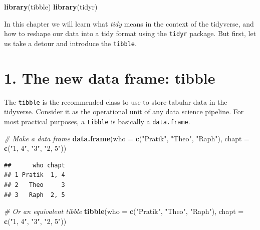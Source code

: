 \documentclass[]{book}
\newenvironment{Shaded}{}{}
\newcommand{\CommentTok}[1]{\textcolor[rgb]{0.38,0.63,0.69}{\textit{#1}}}
\newcommand{\DataTypeTok}[1]{\textcolor[rgb]{0.56,0.13,0.00}{#1}}
\newcommand{\KeywordTok}[1]{\textcolor[rgb]{0.00,0.44,0.13}{\textbf{#1}}}
\newcommand{\NormalTok}[1]{#1}
\newcommand{\StringTok}[1]{\textcolor[rgb]{0.25,0.44,0.63}{#1}}
\begin{document}
\begin{Shaded}
\begin{Highlighting}[]
\KeywordTok{library}\NormalTok{(tibble)}
\KeywordTok{library}\NormalTok{(tidyr)}
\end{Highlighting}
\end{Shaded}

In this chapter we will learn what \emph{tidy} means in the context of the tidyverse, and how to reshape our data into a tidy format using the \texttt{tidyr} package. But first, let us take a detour and introduce the \texttt{tibble}.

\hypertarget{the-new-data-frame-tibble}{%
\section{1. The new data frame: tibble}\label{the-new-data-frame-tibble}}

The \texttt{tibble} is the recommended class to use to store tabular data in the tidyverse. Consider it as the operational unit of any data science pipeline. For most practical purposes, a \texttt{tibble} is basically a \texttt{data.frame}.

\begin{Shaded}
\begin{Highlighting}[]
\CommentTok{# Make a data frame}
\KeywordTok{data.frame}\NormalTok{(}\DataTypeTok{who =} \KeywordTok{c}\NormalTok{(}\StringTok{"Pratik"}\NormalTok{, }\StringTok{"Theo"}\NormalTok{, }\StringTok{"Raph"}\NormalTok{), }\DataTypeTok{chapt =} \KeywordTok{c}\NormalTok{(}\StringTok{"1, 4"}\NormalTok{, }\StringTok{"3"}\NormalTok{, }\StringTok{"2, 5"}\NormalTok{))}
\end{Highlighting}
\end{Shaded}

\begin{verbatim}
##      who chapt
## 1 Pratik  1, 4
## 2   Theo     3
## 3   Raph  2, 5
\end{verbatim}

\begin{Shaded}
\begin{Highlighting}[]
\CommentTok{# Or an equivalent tibble}
\KeywordTok{tibble}\NormalTok{(}\DataTypeTok{who =} \KeywordTok{c}\NormalTok{(}\StringTok{"Pratik"}\NormalTok{, }\StringTok{"Theo"}\NormalTok{, }\StringTok{"Raph"}\NormalTok{), }\DataTypeTok{chapt =} \KeywordTok{c}\NormalTok{(}\StringTok{"1, 4"}\NormalTok{, }\StringTok{"3"}\NormalTok{, }\StringTok{"2, 5"}\NormalTok{))}
\end{Highlighting}
\end{Shaded}
\end{document}

